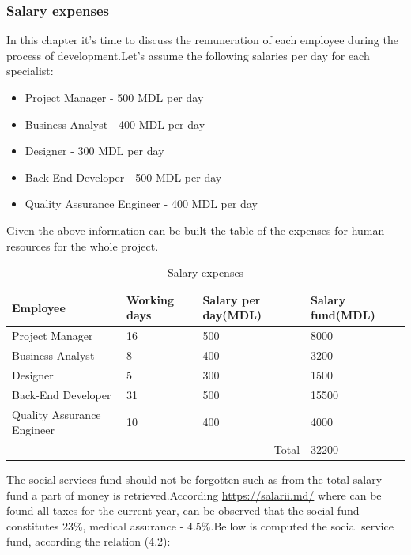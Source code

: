 \subsubsection{Salary expenses}
In this chapter it's time to discuss the remuneration of each employee during the process of development.Let's assume the following salaries per day for each specialist:
\begin{itemize}
	\item Project Manager - 500 MDL per day
	\item Business Analyst - 400 MDL per day
	\item Designer - 300 MDL per day
	\item Back-End Developer - 500 MDL per day
	\item Quality Assurance Engineer - 400 MDL per day
\end{itemize}
Given the above information can be built the table of the expenses for human resources for the whole project.
\begin{table}[H]
	\centering
	\caption{Salary expenses}
	\label{Salary expenses}
	\begin{tabular}{|l|l|l|l|}
		\hline
		\textbf{Employee}          & \textbf{Working days} & \textbf{Salary per day(MDL)} & \textbf{Salary fund(MDL)} \\ \hline
		Project Manager            & 16                    & 500                          & 8000                      \\ \hline
		Business Analyst           & 8                     & 400                          & 3200                      \\ \hline
		Designer                   & 5                     & 300                          & 1500                      \\ \hline
		Back-End Developer         & 31                    & 500                          & 15500                     \\ \hline
		Quality Assurance Engineer & 10                    & 400                          & 4000                      \\ \hline
		\multicolumn{3}{|r|}{Total}                                                       & 32200                     \\ \hline
	\end{tabular}
\end{table}
The social services fund should not be forgotten such as from the total salary fund a part of money is retrieved.According \url{https://salarii.md/} where can be found all taxes for the current year, can be observed that the social fund constitutes 23\%, medical assurance - 4.5\%.Bellow is computed the social service fund, according the relation (4.2):
